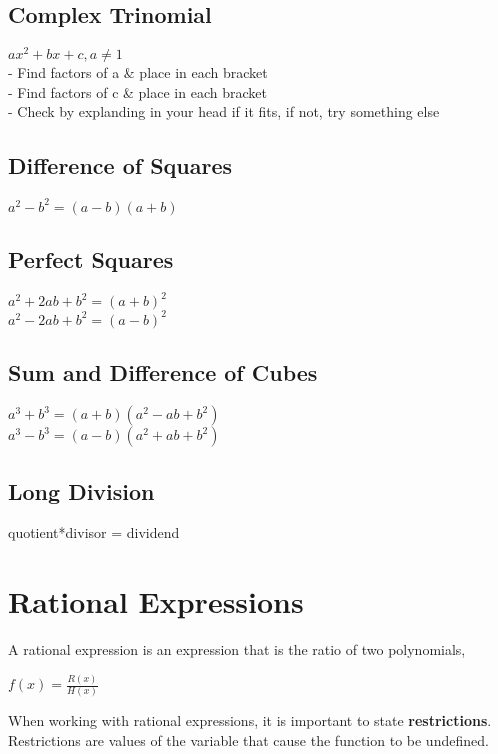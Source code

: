 \documentclass{article}
\begin{document}
\subsection*{Complex Trinomial}
$ax^2+bx+c, a \neq 1$\\
- Find factors of a \& place in each bracket\\
- Find factors of c \& place in each bracket\\
- Check by explanding in your head if it fits, if not, try something else

\subsection*{Difference of Squares}
$a^2-b^2 = (a-b)(a+b)$

\subsection*{Perfect Squares}
$a^2+2ab+b^2 = (a+b)^2$\\
$a^2-2ab+b^2 = (a-b)^2$

\subsection*{Sum and Difference of Cubes}
$a^3+b^3 = (a+b)(a^2-ab+b^2)$\\
$a^3-b^3 = (a-b)(a^2+ab+b^2)$

\subsection*{Long Division}
quotient*divisor = dividend\\



\section{Rational Expressions}

A rational expression is an expression that is the ratio of two polynomials,\\
\begin{center}
$f(x) = \frac{R(x)}{H(x)}$
\end{center}
When working with rational expressions, it is important to state \textbf{restrictions}. Restrictions are values of the variable that cause the function to be undefined.\\\\
\end{document}
